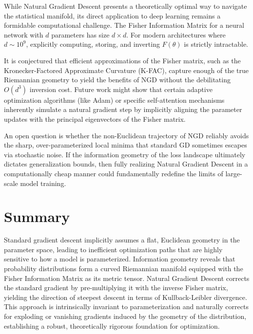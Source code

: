 \begin{horizon}
While Natural Gradient Descent presents a theoretically optimal way to navigate the statistical manifold, its direct application to deep learning remains a formidable computational challenge. The Fisher Information Matrix for a neural network with $d$ parameters has size $d \times d$. For modern architectures where $d \sim 10^9$, explicitly computing, storing, and inverting $F(\theta)$ is strictly intractable. 

It is conjectured that efficient approximations of the Fisher matrix, such as the Kronecker-Factored Approximate Curvature (K-FAC), capture enough of the true Riemannian geometry to yield the benefits of NGD without the debilitating $O(d^3)$ inversion cost. Future work might show that certain adaptive optimization algorithms (like Adam) or specific self-attention mechanisms inherently simulate a natural gradient step by implicitly aligning the parameter updates with the principal eigenvectors of the Fisher matrix.

An open question is whether the non-Euclidean trajectory of NGD reliably avoids the sharp, over-parameterized local minima that standard GD sometimes escapes via stochastic noise. If the information geometry of the loss landscape ultimately dictates generalization bounds, then fully realizing Natural Gradient Descent in a computationally cheap manner could fundamentally redefine the limits of large-scale model training.
\end{horizon}

\section{Summary}
Standard gradient descent implicitly assumes a flat, Euclidean geometry in the parameter space, leading to inefficient optimization paths that are highly sensitive to how a model is parameterized. Information geometry reveals that probability distributions form a curved Riemannian manifold equipped with the Fisher Information Matrix as its metric tensor. Natural Gradient Descent corrects the standard gradient by pre-multiplying it with the inverse Fisher matrix, yielding the direction of steepest descent in terms of Kullback-Leibler divergence. This approach is intrinsically invariant to parameterization and naturally corrects for exploding or vanishing gradients induced by the geometry of the distribution, establishing a robust, theoretically rigorous foundation for optimization.

